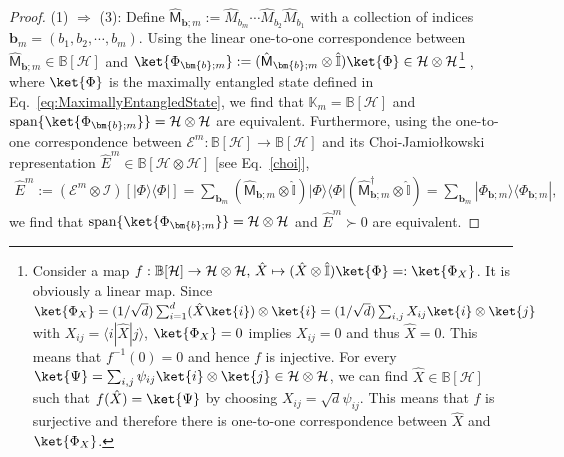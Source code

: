 \documentclass[preprint,pteplogo]{ptephy_v2}%
\numberwithin{equation}{section}
\theoremstyle{definition}
\newcommand{\mc}[1]{\mathcal{#1}}
\newcommand{\mbb}[1]{\mathbb{#1}}
\begin{document}
\begin{proof}
(1) $\Rightarrow$ (3):
Define $\hat{\mathsf{M}}_{\bm{b};m} := \hat{M}_{b_m} \cdots \hat{M}_{b_2} \hat{M}_{b_1}$ with a collection of indices $\bm{b}_m=( b_1, b_2, \cdots, b_m )$.
Using the linear one-to-one correspondence between $\hat{\mathsf{M}}_{\bm{b};m} \in \mbb{B}[\mc{H}]$ and $\ket{\Phi_{\bm{b};m}} := (\hat{\mathsf{M}}_{\bm{b};m} \otimes \hat{\mbb{I}}) \ket{\Phi} \in \mc{H} \otimes \mc{H}$\footnote{
Consider a map $f: \mbb{B}[\mc{H}] \to \mc{H} \otimes \mc{H}, \, \hat{X} \mapsto (\hat{X} \otimes \hat{\mbb{I}}) \ket{\Phi} =: \ket{\Phi_X}$.
It is obviously a linear map.
Since $\ket{\Phi_X} = (1/\sqrt{d}) \sum_{i=1}^d (\hat{X} \ket{i}) \otimes \ket{i} = (1/\sqrt{d}) \sum_{i,j} X_{ij} \ket{i} \otimes \ket{j}$ with $X_{ij} = \langle i | \hat{X} | j \rangle$, $\ket{\Phi_X} = 0$ implies $X_{ij}=0$ and thus $\hat{X}=0$. 
This means that $f^{-1}(0)=0$ and hence $f$ is injective.
For every $\ket{\Psi} = \sum_{i,j} \psi_{ij} \ket{i} \otimes \ket{j} \in \mc{H} \otimes \mc{H}$, we can find $\hat{X} \in \mbb{B}[\mc{H}]$ such that $f(\hat{X}) = \ket{\Psi}$ by choosing $X_{ij} = \sqrt{d} \psi_{ij}$. 
This means that $f$ is surjective and therefore there is one-to-one correspondence between $\hat{X}$ and $\ket{\Phi_X}$.
}
, where $\ket{\Phi}$ is the maximally entangled state defined in Eq.~\eqref{eq:MaximallyEntangledState}, we find that $\mbb{K}_m = \mbb{B}[\mc{H}]$ and $\textrm{span} \{ \ket{\Phi_{\bm{b};m}} \} = \mc{H} \otimes \mc{H}$ are equivalent.
Furthermore, using the one-to-one correspondence between $\mc{E}^m: \mbb{B}[\mc{H}] \to \mbb{B}[\mc{H}]$ and its Choi-Jamiołkowski representation $\hat{E}^m \in \mbb{B}[\mc{H} \otimes \mc{H}]$ [see Eq.~\eqref{choi}], 
\begin{align}
\hat{E}^m 
:= (\mc{E}^m \otimes \mc{I})[| \Phi \rangle \langle \Phi |] 
= \sum_{\bm{b}_m} (\hat{\mathsf{M}}_{\bm{b};m} \otimes \hat{\mbb{I}}) | \Phi \rangle \langle \Phi | (\hat{\mathsf{M}}_{\bm{b};m}^\dagger \otimes \hat{\mbb{I}}) 
= \sum_{\bm{b}_m} | \Phi_{\bm{b};m} \rangle \langle \Phi_{\bm{b};m} |,
\end{align}
we find that $\textrm{span} \{ \ket{\Phi_{\bm{b};m}} \} = \mc{H} \otimes \mc{H}$ and $\hat{E}^m \succ 0$ are equivalent.


\end{proof}
\end{document}
